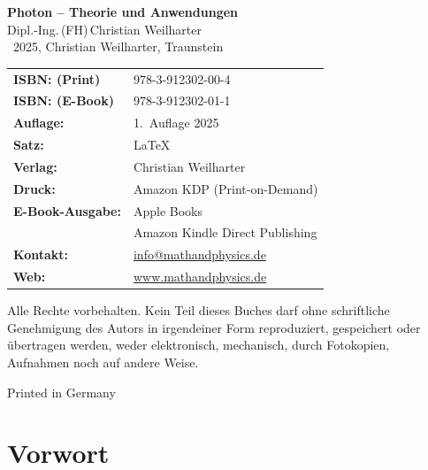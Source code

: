 \cleardoublepage
\thispagestyle{empty}
\begin{center}


{\Large\textbf{Photon – Theorie und Anwendungen}}\\[1.2em]
{\large Dipl.-Ing.\,(FH)\,Christian Weilharter}\\[1.2em]
\textcopyright~2025, Christian Weilharter, Traunstein\\[2em]
\end{center}
\begin{flushleft}
	\begin{tabular}{@{}l l}
	
	
		\textbf{ISBN: (Print)} & 978-3-912302-00-4 \\[0.5em]
			\textbf{ISBN: (E-Book)} & 978-3-912302-01-1 \\[0.5em]
		\textbf{Auflage:} & 1.~Auflage 2025 \\[0.5em]
		\textbf{Satz:} & \LaTeX \\[0.5em]
		\textbf{Verlag:} & Christian Weilharter \\[0.5em]
		\textbf{Druck:} & Amazon KDP (Print-on-Demand) \\[0.5em]

			\textbf{E-Book-Ausgabe:} & Apple Books\\[0.5em]
			&Amazon Kindle Direct Publishing \\[0.5em]
		\textbf{Kontakt:} & \href{mailto:info@mathandphysics.de}{info@mathandphysics.de}\\[0.5em]
		\textbf{Web:} & \href{https://www.mathandphysics.de}{www.mathandphysics.de}\\
		

	\end{tabular}
\end{flushleft}

\vspace{2em}
\noindent
Alle Rechte vorbehalten. Kein Teil dieses Buches darf ohne schriftliche Genehmigung des Autors 
in irgendeiner Form reproduziert, gespeichert oder übertragen werden, 
weder elektronisch, mechanisch, durch Fotokopien, Aufnahmen noch auf andere Weise.
\begin{center}\small Printed in Germany\end{center}

\cleardoublepage

\chapter*{Vorwort}



